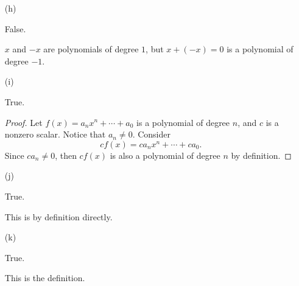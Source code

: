 \begin{Exercise}
\begin{enumerate}[(a)]
		\item [(h)]
		\begin{answer}
			False.
		\end{answer}
		\begin{solution}
			$x$ and $-x$ are polynomials of degree $1$, but $x+(-x) = 0$ is a polynomial of degree $-1$.
		\end{solution}
		
		\item [(i)]
		\begin{answer}
			True.
		\end{answer}
		\begin{proof}
			Let $f(x) = a_n x^n + \cdots + a_0$ is a polynomial of degree $n$, and $c$ is a nonzero scalar. Notice that $a_n \neq 0$. Consider 
			$$
			cf(x) = c a_n x^n + \cdots + c a_0.
			$$
			Since $c a_n \neq 0$, then $cf(x)$ is also a polynomial of degree $n$ by definition.
		\end{proof}
		
		\item [(j)]
		\begin{answer}
			True.
		\end{answer}
		\begin{solution}
			This is by definition directly.
		\end{solution}
		
		\item [(k)]
		\begin{answer}
			True.
		\end{answer}
		\begin{solution}
			This is the definition.
		\end{solution}
	\end{enumerate}
\end{Exercise}